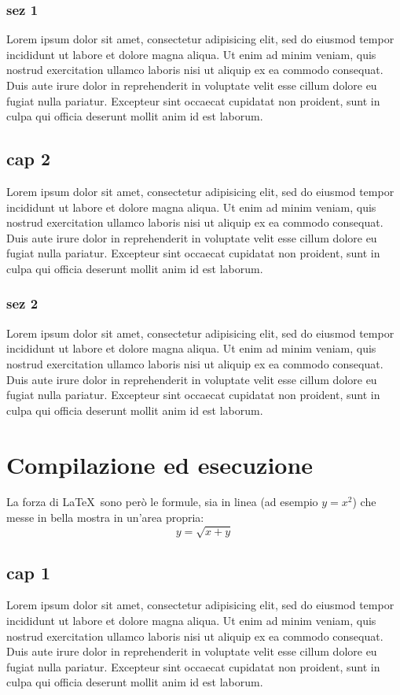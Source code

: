 \documentclass[a4paper,10pt]{report} %
\begin{document}
    \subsection{sez 1}
      Lorem ipsum dolor sit amet, consectetur adipisicing elit, sed do eiusmod tempor incididunt ut labore et dolore magna aliqua. Ut enim ad minim veniam, quis nostrud exercitation ullamco laboris nisi ut aliquip ex ea commodo consequat. Duis aute irure dolor in reprehenderit in voluptate velit esse cillum dolore eu fugiat nulla pariatur. Excepteur sint occaecat cupidatat non proident, sunt in culpa qui officia deserunt mollit anim id est laborum.
  \section{cap 2}
    Lorem ipsum dolor sit amet, consectetur adipisicing elit, sed do eiusmod tempor incididunt ut labore et dolore magna aliqua. Ut enim ad minim veniam, quis nostrud exercitation ullamco laboris nisi ut aliquip ex ea commodo consequat. Duis aute irure dolor in reprehenderit in voluptate velit esse cillum dolore eu fugiat nulla pariatur. Excepteur sint occaecat cupidatat non proident, sunt in culpa qui officia deserunt mollit anim id est laborum.
    \subsection{sez 2}
      Lorem ipsum dolor sit amet, consectetur adipisicing elit, sed do eiusmod tempor incididunt ut labore et dolore magna aliqua. Ut enim ad minim veniam, quis nostrud exercitation ullamco laboris nisi ut aliquip ex ea commodo consequat. Duis aute irure dolor in reprehenderit in voluptate velit esse cillum dolore eu fugiat nulla pariatur. Excepteur sint occaecat cupidatat non proident, sunt in culpa qui officia deserunt mollit anim id est laborum.
\newpage
\chapter{Compilazione ed esecuzione} %
	La forza di \LaTeX\ sono però le formule, sia in linea (ad esempio \(y=x^2\))
   che messe in bella mostra in un'area propria:
  \[y=\sqrt{x+y}\]
  \section{cap 1}
    Lorem ipsum dolor sit amet, consectetur adipisicing elit, sed do eiusmod tempor incididunt ut labore et dolore magna aliqua. Ut enim ad minim veniam, quis nostrud exercitation ullamco laboris nisi ut aliquip ex ea commodo consequat. Duis aute irure dolor in reprehenderit in voluptate velit esse cillum dolore eu fugiat nulla pariatur. Excepteur sint occaecat cupidatat non proident, sunt in culpa qui officia deserunt mollit anim id est laborum.
\end{document}
